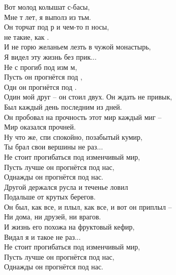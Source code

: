 \documentclass[fleqn,a5paper,12pt,twoside]{guitartabs}
\begin{document}
    Вот  молод колышат с-басы,\\
    Мне т лет, я выполз из тьм.\\
    Он торчат под р и чем-то п носы,\\
     не такие, как .  \\
    И  не горю желаньем лезть в чужой монастырь,\\
    Я видел эту жизнь без прик...\\
    Не с прогиб под изм м,\\
    Пусть  он прогнётся под ,\\
    Одн он прогнётся под .\\
    
    \-\hspace{3mm}Один мой друг -- он стоил двух. Он ждать не привык, \\
    \-\hspace{3mm}Был каждый день последним из дней.        \\       
    \-\hspace{3mm}Он пробовал на прочность этот мир каждый миг --  \\ 
    \-\hspace{3mm}Мир оказался прочней.  \\
    \-\hspace{3mm}Ну что же, спи спокойно, позабытый кумир,       \\                 
    \-\hspace{3mm}Ты брал свои вершины не раз...     \\   
    \-\hspace{3mm}Не стоит прогибаться под изменчивый мир, \\          
    \-\hspace{3mm}Пусть лучше он прогнётся под нас,       \\
    \-\hspace{3mm}Однажды он прогнётся под нас.\\
\newpage
    Другой держался русла и теченье ловил  \\
    Подальше от крутых берегов.      \\
    Он был, как все, и плыл, как все, и вот он приплыл -- \\ 
    Ни дома, ни друзей, ни врагов.  \\
    И жизнь его похожа на фруктовый кефир,         \\             
    Видал я и такое не раз...\\
    Не стоит прогибаться под изменчивый мир,     \\      
    Пусть лучше он прогнётся под нас,    \\        
    Однажды он прогнётся под нас.\\
    
\end{document}
